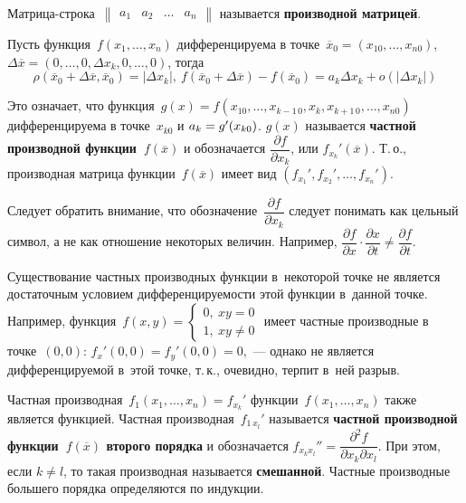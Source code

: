  Матрица-строка~$\begin{Vmatrix}
a_1 & a_2 & \ldots & a_n
\end{Vmatrix}$ называется \textbf{производной матрицей}.

Пусть функция~$f(x_1, \ldots, x_n)$ дифференцируема в точке~$\overline x_0 = (x_{10}, \ldots, x_{n0})$, $\Delta \overline x = (0, \ldots, 0, \Delta x_k, 0, \ldots, 0)$, тогда
\begin{equation*}
\rho(\overline x_0 + \Delta \overline x, \overline x_0) = |\Delta x_k|, \
f(\overline x_0 + \Delta \overline x) - f(\overline x_0) =
a_k \Delta x_k + o(|\Delta x_k|)
\end{equation*}

Это означает, что функция~$g(x) = f(x_{10}, \ldots, x_{k-1\, 0}, x_k, x_{k+1\, 0}, \ldots, x_{n0})$ дифференцируема в точке~$x_{k0}$ и $a_k \opbr= g'(x_{k0})$.
\index{Производная!частная} $g(x)$ называется \textbf{частной производной функции~$f(\overline x)$} и обозначается $\dfrac{\partial f}{\partial x_k}$, или $f_{x_k}'(\overline x)$.
Т.\,о., производная матрица функции~$f(\overline x)$ имеет вид $(f_{x_1}', f_{x_2}', \ldots, f_{x_n}')$.

Следует обратить внимание, что обозначение~$\dfrac{\partial f}{\partial x_k}$ следует понимать как цельный символ, а не как отношение некоторых величин.
Например, $\dfrac{\partial f}{\partial x} \cdot \dfrac{\partial x}{\partial t} \neq \dfrac{\partial f}{\partial t}$.

Существование частных производных функции в~некоторой точке не является достаточным условием дифференцируемости этой функции в~данной точке.
Например, функция~$f(x, y) =
\begin{cases}
0, \ xy = 0 \\
1, \ xy \neq 0
\end{cases}$
имеет частные производные в точке~$(0, 0)$: $f_x'(0, 0) = f_y'(0, 0) = 0$,~--- однако не является дифференцируемой в~этой точке, т.\,к., очевидно, терпит в~ней разрыв.

Частная производная~$f_1(x_1, \ldots, x_n) = f_{x_k}'$ функции~$f(x_1, \ldots, x_n)$ также является функцией.
Частная производная~$f_{1\,x_l}'$ называется \textbf{частной производной функции~$f(\overline x)$ второго порядка} и обозначается $f_{x_k x_l}'' = \dfrac{\partial^2 f}{\partial x_k \partial x_l}$.
При этом, если $k \neq l$, то такая производная называется \textbf{смешанной}.
Частные производные большего порядка определяются по индукции.

